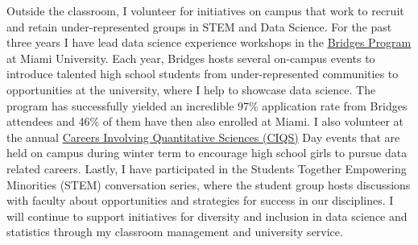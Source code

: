 \documentclass[letterpaper,12pt]{article}\usepackage[]{graphicx}\usepackage[]{color}
\begin{document}
Outside the classroom, I volunteer for initiatives on campus that work to recruit and retain under-represented groups in STEM and Data Science. For the past three years I have lead data science experience workshops in the \href{http://miamioh.edu/admission/high-school/bridges/index.html}{Bridges Program} at Miami University. Each year, Bridges hosts several on-campus events to introduce talented high school students from under-represented communities to opportunities at the university, where I help to showcase data science. The program has successfully yielded an incredible 97\% application rate from Bridges attendees and 46\% of them have then also enrolled at Miami. I also volunteer at the annual \href{https://miamioh.edu/cas/academics/departments/statistics/about/events/ciqs-day/}{Careers Involving Quantitative Sciences (CIQS)} Day events that are held on campus during winter term to encourage high school girls to pursue data related careers. Lastly, I have participated in the Students Together Empowering Minorities (STEM) conversation series, where the student group hosts discussions with faculty about opportunities and strategies for success in our disciplines. I will continue to support initiatives for diversity and inclusion in data science and statistics through my classroom management and university service. 


% 
\end{document}
